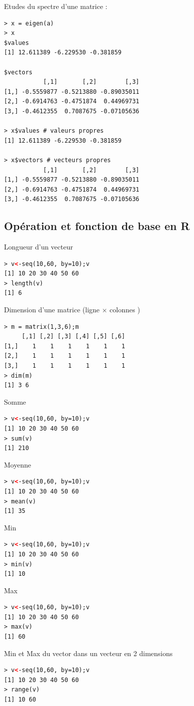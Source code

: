 Etudes du spectre d'une matrice :
\begin{lstlisting}[language=html]
> x = eigen(a)
> x
$values
[1] 12.611389 -6.229530 -0.381859

$vectors
           [,1]       [,2]        [,3]
[1,] -0.5559877 -0.5213880 -0.89035011
[2,] -0.6914763 -0.4751874  0.44969731
[3,] -0.4612355  0.7087675 -0.07105636

> x$values # valeurs propres
[1] 12.611389 -6.229530 -0.381859

> x$vectors # vecteurs propres
           [,1]       [,2]        [,3]
[1,] -0.5559877 -0.5213880 -0.89035011
[2,] -0.6914763 -0.4751874  0.44969731
[3,] -0.4612355  0.7087675 -0.07105636
\end{lstlisting}

\subsection{Opération et fonction de base en R}
Longueur d'un vecteur 
\begin{lstlisting}[language=html]
> v<-seq(10,60, by=10);v
[1] 10 20 30 40 50 60
> length(v)
[1] 6
\end{lstlisting}
Dimension d'une matrice (ligne $\times$ colonnes )
\begin{lstlisting}[language=html]
> m = matrix(1,3,6);m
     [,1] [,2] [,3] [,4] [,5] [,6]
[1,]    1    1    1    1    1    1
[2,]    1    1    1    1    1    1
[3,]    1    1    1    1    1    1
> dim(m)
[1] 3 6
\end{lstlisting}
Somme
\begin{lstlisting}[language=html]
> v<-seq(10,60, by=10);v
[1] 10 20 30 40 50 60
> sum(v)
[1] 210
\end{lstlisting}
Moyenne
\begin{lstlisting}[language=html]
> v<-seq(10,60, by=10);v
[1] 10 20 30 40 50 60
> mean(v)
[1] 35
\end{lstlisting}
Min
\begin{lstlisting}[language=html]
> v<-seq(10,60, by=10);v
[1] 10 20 30 40 50 60
> min(v)
[1] 10
\end{lstlisting}
Max
\begin{lstlisting}[language=html]
> v<-seq(10,60, by=10);v
[1] 10 20 30 40 50 60
> max(v)
[1] 60
\end{lstlisting}
Min et Max du vector dans un vecteur en 2 dimensions
\begin{lstlisting}[language=html]
> v<-seq(10,60, by=10);v
[1] 10 20 30 40 50 60
> range(v)
[1] 10 60
\end{lstlisting}
